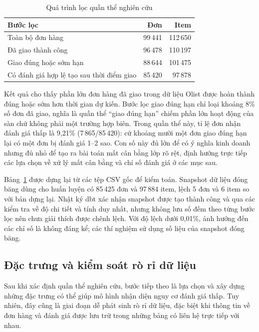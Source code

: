 \documentclass[12pt,a4paper]{report}
\begin{document}
\begin{table}[htbp]\centering\small
\caption{Quá trình lọc quần thể nghiên cứu}\label{tab:funnel}
\begin{tabular}{lrr}
\toprule
Bước lọc & Đơn & Item \\
\midrule
Toàn bộ đơn hàng                          & 99\,441 & 112\,650 \\
Đã giao thành công                        & 96\,478 & 110\,197 \\
Giao đúng hoặc sớm hạn                    & 88\,644 & 101\,475 \\
Có đánh giá hợp lệ tạo sau thời điểm giao & 85\,420 &  97\,878 \\
\bottomrule
\end{tabular}
\end{table}

Kết quả cho thấy phần lớn đơn hàng đã giao trong dữ liệu Olist được hoàn thành đúng hoặc sớm hơn thời gian dự kiến. Bước lọc giao đúng hạn chỉ loại khoảng 8\% số đơn đã giao, nghĩa là quần thể ``giao đúng hạn'' chiếm phần lớn hoạt động của sàn chứ không phải một trường hợp biên. Trong quần thể này, tỉ lệ đơn nhận đánh giá thấp là 9,21\% (7\,865/85\,420): cứ khoảng mười một đơn giao đúng hạn lại có một đơn bị đánh giá 1--2 sao. Con số này đủ lớn để có ý nghĩa kinh doanh nhưng đủ nhỏ để tạo ra bài toán mất cân bằng lớp rõ rệt, định hướng trực tiếp các lựa chọn về xử lý mất cân bằng và chỉ số đánh giá ở các mục sau.

Bảng~\ref{tab:funnel} được dựng lại từ các tệp CSV gốc để kiểm toán. Snapshot dữ liệu đóng băng dùng cho huấn luyện có 85\,425 đơn và 97\,884 item, lệch 5 đơn và 6 item so với bản dựng lại. Nhật ký dbt xác nhận snapshot được tạo thành công và qua các kiểm tra về độ chi tiết và tính duy nhất, nhưng không lưu số đếm theo từng bước lọc nên chưa giải thích được chênh lệch. Với độ lệch dưới 0,01\%, ảnh hưởng đến các chỉ số là không đáng kể; các thí nghiệm sử dụng số liệu của snapshot đóng băng.

\subsection{Đặc trưng và kiểm soát rò rỉ dữ liệu}

Sau khi xác định quần thể nghiên cứu, bước tiếp theo là lựa chọn và xây dựng những đặc trưng có thể giúp mô hình nhận diện nguy cơ đánh giá thấp. Tuy nhiên, đây cũng là giai đoạn dễ phát sinh rò rỉ dữ liệu, đặc biệt khi thông tin về đơn hàng và đánh giá được lưu trữ trong những bảng có liên hệ trực tiếp với nhau.
\end{document}
